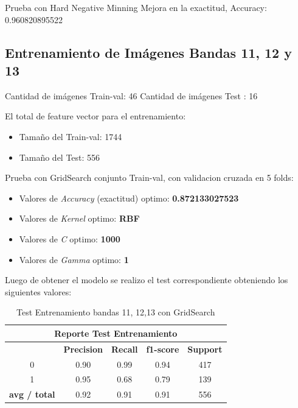 Prueba con Hard Negative Minning
Mejora en la exactitud, Accuracy: 0.960820895522



\subsection{Entrenamiento de Imágenes Bandas 11, 12 y 13}\label{sub:entrenamiento_bandas1111213}

Cantidad de imágenes Train-val: 46 
Cantidad de imágenes Test : 16  

El total de feature vector para el entrenamiento:
\begin{itemize}
\item Tamaño del Train-val: 1744
\item Tamaño del Test: 556
\end{itemize}

Prueba con GridSearch conjunto Train-val, con validacion cruzada en 5 folds:

\begin{itemize}
\item Valores de \textit{Accuracy} (exactitud) optimo: \textbf{0.872133027523}
\item Valores de \textit{Kernel} optimo: \textbf{RBF}
\item Valores de \textit{C} optimo: \textbf{1000}
\item Valores de \textit{Gamma} optimo: \textbf{1}
\end{itemize}

Luego de obtener el modelo se realizo el test correspondiente obteniendo los siguientes valores:
\begin{table}[H]
\begin{center}
\begin{tabular}{|c|c|c|c|c|}
\hline \multicolumn{5}{|c|}{Reporte Test Entrenamiento} \\ \hline
\hline \textbf{} & \textbf{Precision} & \textbf{Recall} & \textbf{f1-score} & \textbf{Support}\\ \hline 
				 0   & 0.90 & 0.99 & 0.94  & 417	\\ \hline 
				 1   & 0.95 & 0.68 & 0.79  & 139 \\ \hline 
\textbf{avg / total} & 0.92 & 0.91 & 0.91  & 556 \\ \hline
\end{tabular}
\end{center} \caption{Test Entrenamiento bandas 11, 12,13 con GridSearch}\label{tab:gridsearchtest111213}
\end{table}


